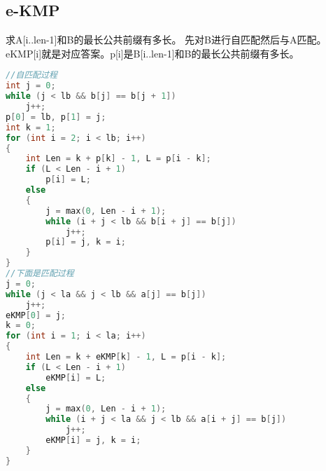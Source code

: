 \subsection{e-KMP}
    求A[i..len-1]和B的最长公共前缀有多长。
    先对B进行自匹配然后与A匹配。
    eKMP[i]就是对应答案。p[i]是B[i..len-1]和B的最长公共前缀有多长。
    \begin{lstlisting}[language=c++]
//自匹配过程
int j = 0;
while (j < lb && b[j] == b[j + 1])
    j++;
p[0] = lb, p[1] = j;
int k = 1;
for (int i = 2; i < lb; i++)
{
    int Len = k + p[k] - 1, L = p[i - k];
    if (L < Len - i + 1)
        p[i] = L;
    else
    {
        j = max(0, Len - i + 1);
        while (i + j < lb && b[i + j] == b[j])
            j++;
        p[i] = j, k = i;
    }
}
//下面是匹配过程
j = 0;
while (j < la && j < lb && a[j] == b[j])
    j++;
eKMP[0] = j;
k = 0;
for (int i = 1; i < la; i++)
{
    int Len = k + eKMP[k] - 1, L = p[i - k];
    if (L < Len - i + 1)
        eKMP[i] = L;
    else
    {
        j = max(0, Len - i + 1);
        while (i + j < la && j < lb && a[i + j] == b[j])
            j++;
        eKMP[i] = j, k = i;
    }
}
    \end{lstlisting} 